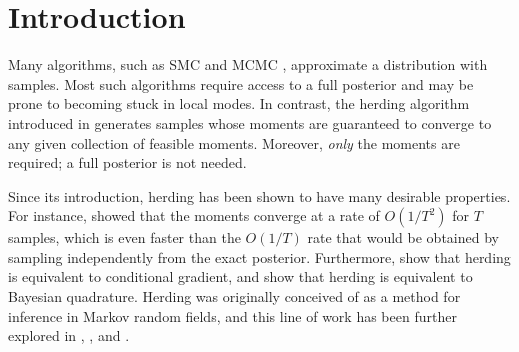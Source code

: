 \documentclass[paper.tex]{subfiles}
\begin{document}
\section{Introduction} 
\label{sec:intro}

Many algorithms, such as SMC \citep{smc} and MCMC \citep{mcmc}, approximate a 
distribution with samples. Most such algorithms require access to a full posterior and 
may be prone to becoming stuck in local modes. In contrast, the herding algorithm introduced in 
\citet{Welling:2009a} generates samples whose moments are guaranteed to converge 
to any given collection of feasible moments. Moreover, \emph{only} the moments 
are required; a full posterior is not needed.

Since its introduction, herding has been shown to have many desirable properties.
For instance, \citet{Chen:2010a} showed that the moments converge at a rate of $O(1/T^{2})$ for 
$T$ samples, which is even faster than the $O(1/T)$ rate that would be obtained 
by sampling independently from the exact posterior. Furthermore, \citet{Bach:2012a} show that herding is 
equivalent to conditional gradient, and \citet{Huszar:2012} show that 
herding is equivalent to Bayesian quadrature. Herding was originally conceived of as a method 
for inference in Markov random fields, and this line of work has been further explored in 
\citet{Welling:2009a}, \citet{Gelfand:2010}, and \citet{Bornn:2013}.
\end{document}
